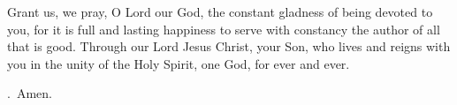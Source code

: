 \lettrine[lines=3]{G}{}rant us, we pray, O Lord our God, the constant gladness of being devoted to you, for it is full and lasting happiness to serve with constancy the author of all that is good. Through our Lord Jesus Christ, your Son, who lives and reigns with you in the unity of the Holy Spirit, one God, for ever and ever. \par \Rbar.~Amen.
